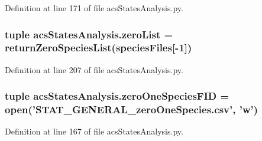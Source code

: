Definition at line 171 of file acs\-States\-Analysis.\-py.

\hypertarget{a00098_ac2f9e6ead14745bd749a1ab8060cd4e7}{
\subsubsection[{zero\-List}]{\setlength{\rightskip}{0pt plus 5cm}tuple acs\-States\-Analysis.\-zero\-List = {\bf return\-Zero\-Species\-List}({\bf species\-Files}\mbox{[}-\/1\mbox{]})}}\label{a00098_ac2f9e6ead14745bd749a1ab8060cd4e7}


Definition at line 207 of file acs\-States\-Analysis.\-py.

\hypertarget{a00098_a3dc90aca8a97c5995b013887c98d8ce9}{
\subsubsection[{zero\-One\-Species\-F\-I\-D}]{\setlength{\rightskip}{0pt plus 5cm}tuple acs\-States\-Analysis.\-zero\-One\-Species\-F\-I\-D = open('S\-T\-A\-T\-\_\-\-G\-E\-N\-E\-R\-A\-L\-\_\-zero\-One\-Species.\-csv', 'w')}}\label{a00098_a3dc90aca8a97c5995b013887c98d8ce9}


Definition at line 167 of file acs\-States\-Analysis.\-py.

